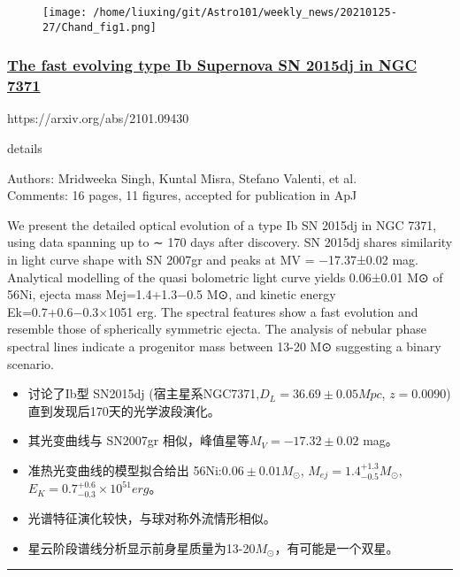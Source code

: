 \documentclass[
]{article}
\begin{document}
\begin{figure}
\centering
\texttt{[image: /home/liuxing/git/Astro101/weekly\_news/20210125-27/Chand\_fig1.png]}
\caption{}
\end{figure}

\hypertarget{header-n127}{%
\subsubsection{\texorpdfstring{\href{./2101.09430.pdf}{The fast evolving
type Ib Supernova SN 2015dj in NGC
7371}}{The fast evolving type Ib Supernova SN 2015dj in NGC 7371}}\label{header-n127}}

https://arxiv.org/abs/2101.09430

details

Authors: Mridweeka Singh, Kuntal Misra, Stefano Valenti, et al.\\
Comments: 16 pages, 11 figures, accepted for publication in ApJ

We present the detailed optical evolution of a type Ib SN 2015dj in NGC
7371, using data spanning up to ∼ 170 days after discovery. SN 2015dj
shares similarity in light curve shape with SN 2007gr and peaks at MV =
−17.37±0.02 mag. Analytical modelling of the quasi bolometric light
curve yields 0.06±0.01 M⊙ of 56Ni, ejecta mass Mej=1.4+1.3−0.5 M⊙, and
kinetic energy Ek=0.7+0.6−0.3×1051 erg. The spectral features show a
fast evolution and resemble those of spherically symmetric ejecta. The
analysis of nebular phase spectral lines indicate a progenitor mass
between 13-20 M⊙ suggesting a binary scenario.

\begin{itemize}
\item
  讨论了Ib型 SN2015dj (宿主星系NGC7371,\(D_L = 36.69\pm 0.05 Mpc\),
  \(z=0.0090\)) 直到发现后170天的光学波段演化。
\item
  其光变曲线与 SN2007gr 相似，峰值星等\(M_V = -17.32\pm 0.02\) mag。
\item
  准热光变曲线的模型拟合给出 56Ni:\(0.06\pm 0.01 M_⊙\),
  \(M_{ej} = 1.4^{+1.3}_{-0.5} M_⊙\),
  \(E_K =0.7^{+0.6}_{-0.3} \times 10^{51} erg\)。
\item
  光谱特征演化较快，与球对称外流情形相似。
\item
  星云阶段谱线分析显示前身星质量为13-20\(M_⊙\)，有可能是一个双星。
\end{itemize}

\begin{center}\rule{0.5\linewidth}{0.5pt}\end{center}
\end{document}
